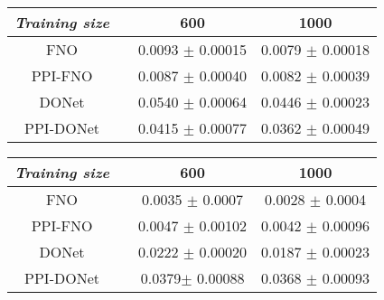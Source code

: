\begin{table*}[h]
    \caption{\small Relative $L_2$ error in five operator learning benchmarks with richer data, where ``PPI'' is short for ``Pseudo-Physics Informed''. The results were averaged from five runs.  } \label{tb:pred-error-large-data}
    \small
    \centering
    \begin{subtable}{\textwidth}
        \caption{\small \textit{Darcy flow}}\label{tab:darcy}
        \small 
        \centering
    \begin{tabular}{cccc}
        \hline
        \textit{Training size}      &  & {600}             & {1000}             \\ \hline
        FNO                  &  & 0.0093 $\pm$ 0.00015	& 0.0079 $\pm$ 0.00018          \\
        PPI-FNO          &  & {0.0087} $\pm$ {0.00040}          & {0.0082} $\pm$ {0.00039}      \\
        \hline
        DONet             &  & 0.0540 $\pm$ 0.00064         & 0.0446 $\pm$ 0.00023       \\
        PPI-DONet             &  & 0.0415 $\pm$ 0.00077        & 0.0362 $\pm$ 0.00049     \\ \hline
    \end{tabular}
    \end{subtable}
    \begin{subtable}{\textwidth}
        \caption{\small \textit{Nonlinear diffusion}}
        \small
        \centering
        \begin{tabular}{cccc}
        \hline
        \textit{Training size}      &  & {600}             & {1000}            \\ \hline
        FNO                  &  & 0.0035 $\pm$ 0.0007	& 0.0028 $\pm$ 0.0004       \\
        PPI-FNO          &  & 0.0047 $\pm$ 0.00102         & 0.0042 $\pm$ 0.00096         \\
        \hline
        DONet             &  & 0.0222 $\pm$ 0.00020         & 0.0187 $\pm$ 0.00023      \\
        PPI-DONet             &  & 0.0379$\pm$ 0.00088         & 0.0368 $\pm$ 0.00093 	 \\ \hline

\end{tabular}
\end{subtable}
\end{table*}
